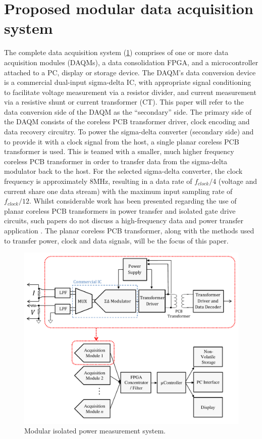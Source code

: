 \documentclass[conference]{IEEEtran}
\begin{document}
\section{Proposed modular data acquisition system}
The complete data acquisition system (\ref{fig:FullSystem}) comprises of one or more data acquisition modules (DAQMs), a data consolidation FPGA, and a microcontroller attached to a PC, display or storage device.  
The DAQM's data conversion device is a commercial dual-input sigma-delta IC, with appropriate signal conditioning to facilitate voltage measurement via a resistor divider, and current measurement via a resistive shunt or current transformer (CT).  This paper will refer to the data conversion side of the DAQM as the ``secondary'' side.  The primary side of the DAQM consists of the coreless PCB transformer driver, clock encoding and data recovery circuitry.  To power the sigma-delta converter (secondary side) and to provide it with a clock signal from the host, a single planar coreless PCB transformer is used.  This is teamed with a smaller, much higher frequency coreless PCB transformer in order to transfer data from the sigma-delta modulator back to the host.  For the selected sigma-delta converter, the clock frequency is approximately 8MHz, resulting in a data rate of $ f_{clock}/4 $ (voltage and current share one data stream) with the maximum input sampling rate of $ f_{clock}/12 $.
Whilst considerable work has been presented regarding the use of planar coreless PCB transformers in power transfer and isolated gate drive circuits, such papers do not discuss a high-frequency data and power transfer application \cite{TangHuiFundamental}\cite{NaturallySoft}\cite{OptimalOperation}\cite{CorelessGateDrive}.  The planar coreless PCB transformer, along with the methods used to transfer power, clock and data signals, will be the focus of this paper.

\begin{figure}[t]
	\centering
	\includegraphics[width=1\columnwidth]{./img/FullSystem_BasicCol}
	\caption{Modular isolated power measurement system.}
	\label{fig:FullSystem}
\end{figure}
\end{document}
